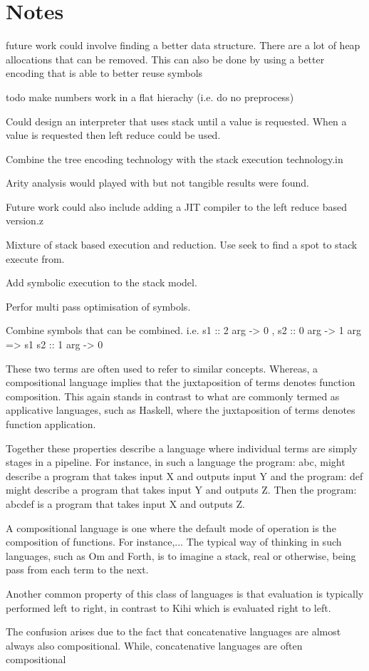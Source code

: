 \chapter{Notes}\label{C:notes}

future work could involve finding a better data structure.
There are a lot of heap allocations that can be removed.
This can also be done by using a better encoding that is able
to better reuse symbols

todo make numbers work in a flat hierachy  (i.e. do no preprocess)

Could design an interpreter that uses stack until a value is requested. When a
value is requested then left reduce could be used.

Combine the tree encoding technology with the stack execution technology.in

Arity analysis would played with but not tangible results were found.

Future work could also include adding a JIT compiler to the left reduce based version.z


Mixture of stack based execution and reduction.
Use seek to find a spot to stack execute from.

Add symbolic execution to the stack model.

Perfor multi pass optimisation of symbols.

Combine symbols that can be combined. i.e. s1 :: 2 arg -> 0 , s2 :: 0 arg -> 1 arg => s1 s2 :: 1 arg -> 0



These two terms are often used to refer to similar concepts. Whereas, a compositional language implies that the juxtaposition of terms denotes function composition. This again stands in contrast to what are commonly termed as applicative languages, such as Haskell, where the juxtaposition of terms denotes
function application.

Together these properties describe a language where individual terms are simply stages in a pipeline. For instance, in such a language the program: abc, might describe a program that takes
input X and outputs input Y and the program: def might describe a program that takes input Y and outputs Z. Then the program: abcdef is a program that takes input X and outputs Z.

A compositional language is one where the default mode of operation
is the composition of functions. For instance,...
The typical way of thinking in such languages, such as Om and Forth,
is to imagine a stack, real or otherwise, being pass from each term
to the next.

Another common property of this class of languages is that evaluation
is typically performed left to right, in contrast to Kihi which is
evaluated right to left.

The confusion arises due to the fact that concatenative languages are
almost always also compositional.
While, concatenative languages are often compositional 

